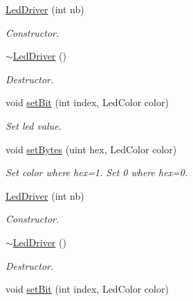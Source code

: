 \begin{DoxyCompactItemize}
\mbox{\label{classLedDriver_a23265705c54ed45e32b91ed9b2f4e0b6}} 
\hyperlink{classLedDriver_a23265705c54ed45e32b91ed9b2f4e0b6}{Led\+Driver} (int nb)
\begin{DoxyCompactList}\small\item\em Constructor. \end{DoxyCompactList}\item 
\mbox{\label{classLedDriver_a8b6afd79e2715068ff08c51a9df28065}} 
\hyperlink{classLedDriver_a8b6afd79e2715068ff08c51a9df28065}{$\sim$\+Led\+Driver} ()
\begin{DoxyCompactList}\small\item\em Destructor. \end{DoxyCompactList}\item 
void \hyperlink{classLedDriver_af5ec63943cb92b14a887fdd2a5491e93}{set\+Bit} (int index, Led\+Color color)
\begin{DoxyCompactList}\small\item\em Set led value. \end{DoxyCompactList}\item 
void \hyperlink{classLedDriver_a66512dd673a81681d3597e301af13759}{set\+Bytes} (uint hex, Led\+Color color)
\begin{DoxyCompactList}\small\item\em Set color where hex=1. Set 0 where hex=0. \end{DoxyCompactList}\item 
\mbox{\label{classLedDriver_a23265705c54ed45e32b91ed9b2f4e0b6}} 
\hyperlink{classLedDriver_a23265705c54ed45e32b91ed9b2f4e0b6}{Led\+Driver} (int nb)
\begin{DoxyCompactList}\small\item\em Constructor. \end{DoxyCompactList}\item 
\mbox{\label{classLedDriver_a8b6afd79e2715068ff08c51a9df28065}} 
\hyperlink{classLedDriver_a8b6afd79e2715068ff08c51a9df28065}{$\sim$\+Led\+Driver} ()
\begin{DoxyCompactList}\small\item\em Destructor. \end{DoxyCompactList}\item 
void \hyperlink{classLedDriver_af5ec63943cb92b14a887fdd2a5491e93}{set\+Bit} (int index, Led\+Color color)

\end{DoxyCompactItemize}
